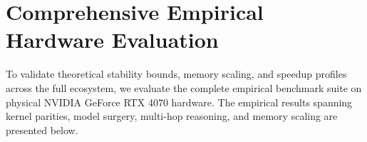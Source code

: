 \documentclass[journal]{IEEEtran}
\begin{document}


\section{Comprehensive Empirical Hardware Evaluation}
To validate theoretical stability bounds, memory scaling, and speedup profiles across the full ecosystem, we evaluate the complete empirical benchmark suite on physical NVIDIA GeForce RTX 4070 hardware. The empirical results spanning kernel parities, model surgery, multi-hop reasoning, and memory scaling are presented below.
\end{document}

